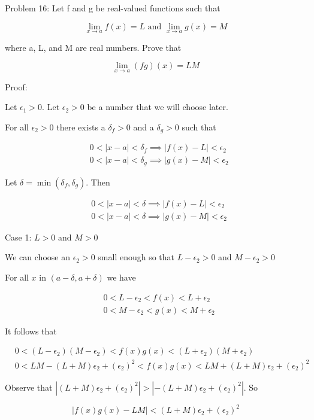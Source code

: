   Problem 16: Let f and g be real-valued functions such that

    $$ \lim_{x \rightarrow a} f(x) = L \text{ and } \lim_{x \rightarrow a} g(x) = M $$

where a, L, and M are real numbers. Prove that

    $$ \lim_{x \rightarrow a} (fg)(x) = LM $$

Proof:

Let $\epsilon_1 > 0$. Let $\epsilon_2 > 0$ be a number that we will choose later.

For all $\epsilon_2 > 0$ there exists a $\delta_f > 0$ and a $\delta_g > 0$ such that

\begin{align*}
& 0 < |x - a| < \delta_f \implies |f(x) - L| < \epsilon_2 \\
& 0 < |x - a| < \delta_g \implies |g(x) - M| < \epsilon_2
\end{align*}

Let $\delta = \min(\delta_f, \delta_g)$. Then

\begin{align*}
& 0 < |x - a| < \delta \implies |f(x) - L| < \epsilon_2 \\
& 0 < |x - a| < \delta \implies |g(x) - M| < \epsilon_2
\end{align*}

Case 1: $L > 0$ and $M > 0$

We can choose an $\epsilon_2 > 0$ small enough so that $L - \epsilon_2 > 0$ and $M - \epsilon_2 > 0$

For all $x$ in $(a - \delta, a + \delta)$ we have

\begin{align*}
& 0 < L - \epsilon_2 < f(x) < L + \epsilon_2 \\
& 0 < M - \epsilon_2 < g(x) < M + \epsilon_2
\end{align*}

It follows that

\begin{align*}
& 0 < (L - \epsilon_2)(M - \epsilon_2) < f(x)g(x) < (L + \epsilon_2)(M + \epsilon_2) \\
& 0 < LM - (L + M)\epsilon_2 + (\epsilon_2)^2 < f(x)g(x) < LM + (L + M)\epsilon_2 + (\epsilon_2)^2
\end{align*}

Observe that $|(L + M)\epsilon_2 + (\epsilon_2)^2| > |-(L + M)\epsilon_2 + (\epsilon_2)^2|$. So

    $$ |f(x)g(x) - LM| < (L + M)\epsilon_2 + (\epsilon_2)^2 $$

